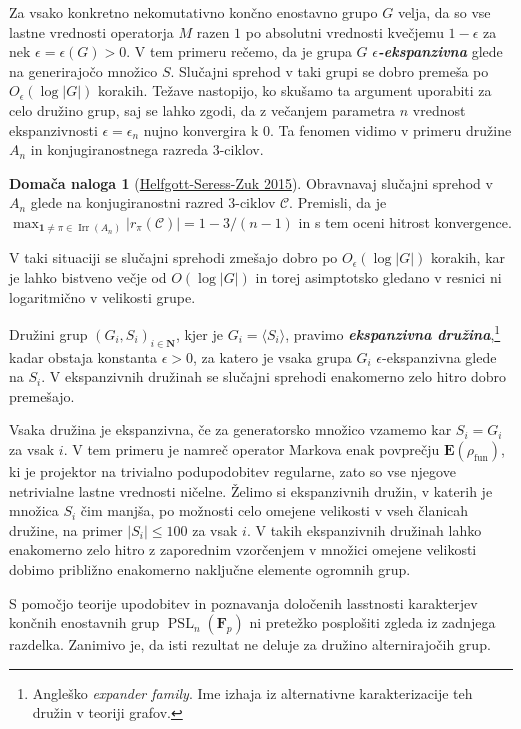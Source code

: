 \documentclass[11pt]{book}
\def\NN{\mathbf{N}}
\def\conclass{\mathcal{C}}
\def\11{\mathbf{1}}
\def\FF{\mathbf{F}}
\def\EE{\mathbf{E}}
\DeclareMathOperator\Irr{Irr}
\DeclareMathOperator\fun{fun}
\DeclareMathOperator\PSL{PSL}
\def\definicija{\color{rdeca}\bf\em}
\theoremstyle{definition}
\theoremstyle{zgled}
\theoremstyle{odprtproblem}
\theoremstyle{domacanaloga}
\newtheorem*{domacanaloga}{Domača naloga}
\theoremstyle{izrek}
\begin{document}
Za vsako konkretno nekomutativno končno enostavno grupo $G$ velja, da so vse lastne vrednosti operatorja $M$ razen $1$ po absolutni vrednosti kvečjemu $1-\epsilon$ za nek $\epsilon = \epsilon(G) > 0$. V tem primeru rečemo, da je grupa $G$ {\definicija $\epsilon$-ekspanzivna} glede na generirajočo množico $S$. Slučajni sprehod v taki grupi se dobro premeša po $O_{\epsilon}(\log |G|)$ korakih. Težave nastopijo, ko skušamo ta argument uporabiti za celo družino grup, saj se lahko zgodi, da z večanjem parametra $n$ vrednost ekspanzivnosti $\epsilon = \epsilon_n$ nujno konvergira k $0$. Ta fenomen vidimo v primeru družine $A_n$ in konjugiranostnega razreda $3$-ciklov. 

\begin{domacanaloga}[\href{https://www.sciencedirect.com/science/article/pii/S0021869314004797}{Helfgott-Seress-Zuk 2015}]
    Obravnavaj slučajni sprehod v $A_n$ glede na konjugiranostni razred $3$-ciklov $\conclass$. Premisli, da je $\max_{\11 \neq \pi \in \Irr(A_n)} |r_{\pi}(\conclass)| = 1 - 3/(n-1)$ in s tem oceni hitrost konvergence.
    \end{domacanaloga}

V taki situaciji se slučajni sprehodi zmešajo dobro po $O_{\epsilon}(\log |G|)$ korakih, kar je lahko bistveno večje od $O(\log |G|)$ in torej asimptotsko gledano v resnici ni logaritmično v velikosti grupe.

Družini grup $(G_i, S_i)_{i \in \NN}$, kjer je $G_i = \langle S_i \rangle$, pravimo {\definicija ekspanzivna družina},\footnote{Angleško \emph{expander family}. Ime izhaja iz alternativne karakterizacije teh družin v teoriji grafov.} kadar obstaja konstanta $\epsilon > 0$, za katero je vsaka grupa $G_i$ $\epsilon$-ekspanzivna  glede na $S_i$. V ekspanzivnih družinah se slučajni sprehodi enakomerno zelo hitro dobro premešajo.

Vsaka družina je ekspanzivna, če za generatorsko množico vzamemo kar $S_i = G_i$ za vsak $i$. V tem primeru je namreč operator Markova enak povprečju $\EE(\rho_{\fun})$, ki je projektor na trivialno podupodobitev regularne, zato so vse njegove netrivialne lastne vrednosti ničelne. Želimo si ekspanzivnih družin, v katerih je množica $S_i$ čim manjša, po možnosti celo omejene velikosti v vseh članicah družine, na primer $|S_i| \leq 100$ za vsak $i$. V takih ekspanzivnih družinah lahko enakomerno zelo hitro z zaporednim vzorčenjem v množici omejene velikosti dobimo približno enakomerno naključne elemente ogromnih grup.

S pomočjo teorije upodobitev in poznavanja določenih lasstnosti karakterjev končnih enostavnih grup $\PSL_n(\FF_p)$ ni pretežko posplošiti zgleda iz zadnjega razdelka. Zanimivo je, da isti rezultat ne deluje za družino alternirajočih grup. 
\end{document}

